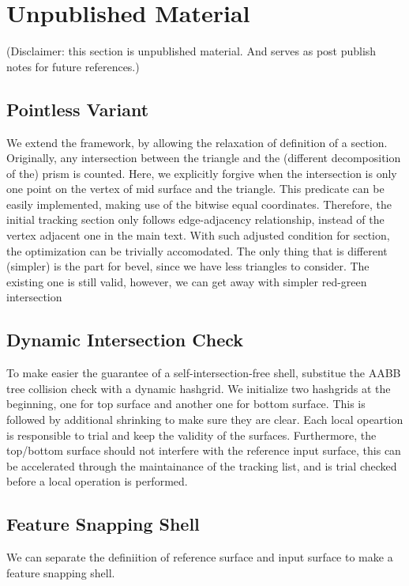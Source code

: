 \section{Unpublished Material}
(Disclaimer: this section is unpublished material. And serves as post publish notes for future references.)
\subsection{Pointless Variant}
We extend the framework, by allowing the relaxation of definition of a section. 
Originally, any intersection between the triangle and the (different decomposition of the) prism is counted. Here, we explicitly forgive when the intersection is only one point on the vertex of mid surface and the triangle. 
This predicate can be easily implemented, making use of the bitwise equal coordinates.
Therefore, the initial tracking section only follows edge-adjacency relationship, instead of the vertex adjacent one in the main text. 
With such adjusted condition for section, the optimization can be trivially accomodated. The only thing that is different (simpler) is the part for bevel, since we have less triangles to consider.
The existing one is still valid, however, we can get away with simpler red-green intersection

\subsection{Dynamic Intersection Check}
To make easier the guarantee of a self-intersection-free shell, substitue the AABB tree collision check with a dynamic hashgrid. We initialize two hashgrids at the beginning, one for top surface and another one for bottom surface. This is followed by additional shrinking to make sure they are clear. Each local opeartion is responsible to trial and keep the validity of the surfaces. Furthermore, the top/bottom surface should not interfere with the reference input surface, this can be accelerated through the maintainance of the tracking list, and is trial checked before a local operation is performed.

\subsection{Feature Snapping Shell}
We can separate the definiition of reference surface and input surface to make a feature snapping shell.

